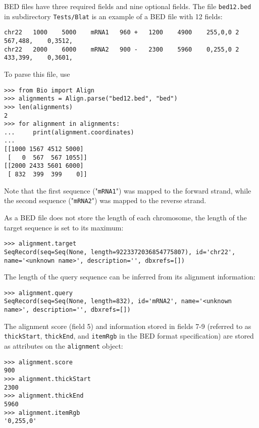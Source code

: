 BED files have three required fields and nine optional fields. The file \verb|bed12.bed| in subdirectory \verb|Tests/Blat| is an example of a BED file with 12 fields:
\begin{verbatim}
chr22	1000	5000	mRNA1	960	+	1200	4900	255,0,0	2	567,488,	0,3512,
chr22	2000	6000	mRNA2	900	-	2300	5960	0,255,0	2	433,399,	0,3601,
\end{verbatim}
To parse this file, use
\begin{verbatim}
>>> from Bio import Align
>>> alignments = Align.parse("bed12.bed", "bed")
>>> len(alignments)
2
>>> for alignment in alignments:
...     print(alignment.coordinates)
...
[[1000 1567 4512 5000]
 [   0  567  567 1055]]
[[2000 2433 5601 6000]
 [ 832  399  399    0]]
\end{verbatim}
Note that the first sequence ("\verb|mRNA1|") was mapped to the forward strand, while the second sequence ("\verb|mRNA2|") was mapped to the reverse strand.

As a BED file does not store the length of each chromosome, the length of the target sequence is set to its maximum:
\begin{verbatim}
>>> alignment.target
SeqRecord(seq=Seq(None, length=9223372036854775807), id='chr22', name='<unknown name>', description='', dbxrefs=[])
\end{verbatim}
The length of the query sequence can be inferred from its alignment information:
\begin{verbatim}
>>> alignment.query
SeqRecord(seq=Seq(None, length=832), id='mRNA2', name='<unknown name>', description='', dbxrefs=[])
\end{verbatim}
The alignment score (field 5) and information stored in fields 7-9 (referred to as \verb|thickStart|, \verb|thickEnd|, and \verb|itemRgb| in the BED format specification) are stored as attributes on the \verb|alignment| object:
\begin{verbatim}
>>> alignment.score
900
>>> alignment.thickStart
2300
>>> alignment.thickEnd
5960
>>> alignment.itemRgb
'0,255,0'
\end{verbatim}


